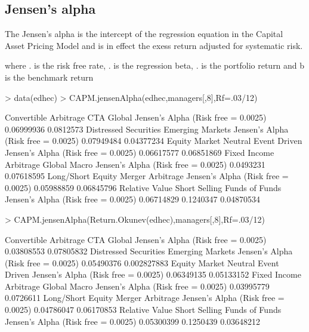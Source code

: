 \documentclass[12pt,letterpaper,english]{article}
\begin{document}
\subsection{Jensen's alpha }

The Jensen's alpha is the intercept of the regression equation in the Capital Asset Pricing Model and is in effect the exess return adjusted for systematic risk.


where . is the risk free rate, . is the regression beta, . is the portfolio return and b is the benchmark return

\begin{Schunk}
\begin{Sinput}
> data(edhec)
> CAPM.jensenAlpha(edhec,managers[,8],Rf=.03/12)
\end{Sinput}
\begin{Soutput}
                                    Convertible Arbitrage CTA Global
Jensen's Alpha (Risk free = 0.0025)            0.06999936  0.0812573
                                    Distressed Securities Emerging Markets
Jensen's Alpha (Risk free = 0.0025)            0.07949484       0.04377234
                                    Equity Market Neutral Event Driven
Jensen's Alpha (Risk free = 0.0025)            0.06617577   0.06851869
                                    Fixed Income Arbitrage Global Macro
Jensen's Alpha (Risk free = 0.0025)              0.0493231   0.07618595
                                    Long/Short Equity Merger Arbitrage
Jensen's Alpha (Risk free = 0.0025)        0.05988859       0.06845796
                                    Relative Value Short Selling Funds of Funds
Jensen's Alpha (Risk free = 0.0025)     0.06714829     0.1240347     0.04870534
\end{Soutput}
\begin{Sinput}
> CAPM.jensenAlpha(Return.Okunev(edhec),managers[,8],Rf=.03/12)
\end{Sinput}
\begin{Soutput}
                                    Convertible Arbitrage CTA Global
Jensen's Alpha (Risk free = 0.0025)            0.03808553 0.07805832
                                    Distressed Securities Emerging Markets
Jensen's Alpha (Risk free = 0.0025)            0.05490376      0.002827883
                                    Equity Market Neutral Event Driven
Jensen's Alpha (Risk free = 0.0025)            0.06349135   0.05133152
                                    Fixed Income Arbitrage Global Macro
Jensen's Alpha (Risk free = 0.0025)             0.03995779    0.0726611
                                    Long/Short Equity Merger Arbitrage
Jensen's Alpha (Risk free = 0.0025)        0.04786047       0.06170853
                                    Relative Value Short Selling Funds of Funds
Jensen's Alpha (Risk free = 0.0025)     0.05300399     0.1250439     0.03648212
\end{Soutput}
\end{Schunk}
\end{document}
